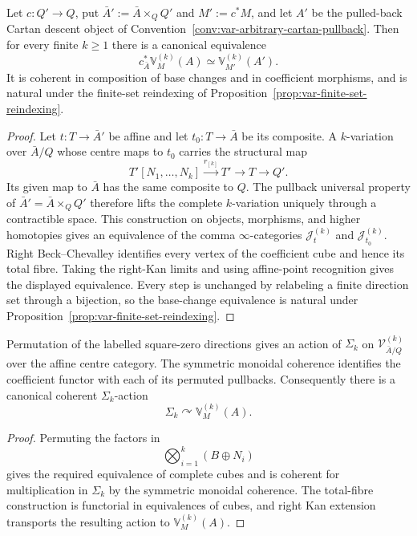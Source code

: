 \begin{theorem}
\label{thm:var-k-base-change}
Let \(c:Q'\to Q\), put \(\bar A':=\bar A\times_QQ'\) and \(M':=c^*M\), and let \(A'\) be the pulled-back Cartan descent object of Convention~\ref{conv:var-arbitrary-cartan-pullback}. Then for every finite \(k\ge1\) there is a canonical equivalence
\[
    \boxed{
    c_{\bar A}^*\mathbb V_M^{(k)}(A)
    \simeq
    \mathbb V_{M'}^{(k)}(A').
    }
\]
It is coherent in composition of base changes and in coefficient morphisms, and is natural under the finite-set reindexing of Proposition~\ref{prop:var-finite-set-reindexing}.
\end{theorem}

\begin{proof}
Let \(t:T\to\bar A'\) be affine and let \(t_0:T\to\bar A\) be its composite. A \(k\)-variation over \(\bar A/Q\) whose centre maps to \(t_0\) carries the structural map
\[
    T'[N_1,\ldots,N_k]
    \xrightarrow{r_{[k]}}
    T'\longrightarrow T\longrightarrow Q'.
\]
Its given map to \(\bar A\) has the same composite to \(Q\). The pullback universal property of \(\bar A'=\bar A\times_QQ'\) therefore lifts the complete \(k\)-variation uniquely through a contractible space. This construction on objects, morphisms, and higher homotopies gives an equivalence of the comma \(\infty\)-categories \(\mathcal J_t^{(k)}\) and \(\mathcal J_{t_0}^{(k)}\). Right Beck--Chevalley identifies every vertex of the coefficient cube and hence its total fibre. Taking the right-Kan limits and using affine-point recognition gives the displayed equivalence. Every step is unchanged by relabeling a finite direction set through a bijection, so the base-change equivalence is natural under Proposition~\ref{prop:var-finite-set-reindexing}.
\end{proof}

\begin{theorem}
\label{thm:var-k-symmetry}
Permutation of the labelled square-zero directions gives an action of \(\Sigma_k\) on \(\mathcal V^{(k)}_{\bar A/Q}\) over the affine centre category. The symmetric monoidal coherence identifies the coefficient functor with each of its permuted pullbacks. Consequently there is a canonical coherent \(\Sigma_k\)-action
\[
    \boxed{
    \Sigma_k\curvearrowright\mathbb V_M^{(k)}(A).
    }
\]
\end{theorem}

\begin{proof}
Permuting the factors in
\[
    \bigotimes_{i=1}^k(B\oplus N_i)
\]
gives the required equivalence of complete cubes and is coherent for multiplication in \(\Sigma_k\) by the symmetric monoidal coherence. The total-fibre construction is functorial in equivalences of cubes, and right Kan extension transports the resulting action to \(\mathbb V_M^{(k)}(A)\).
\end{proof}


